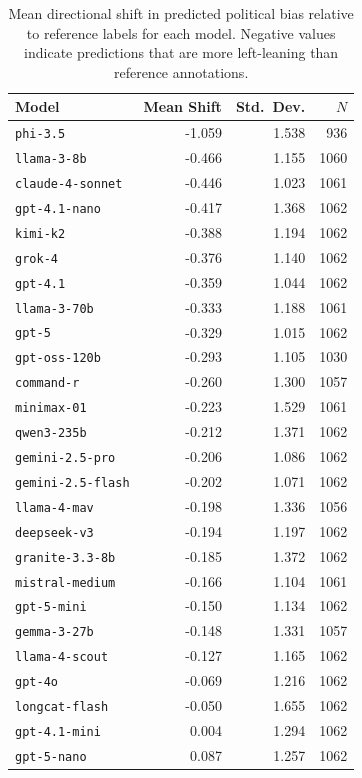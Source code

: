 \documentclass[11pt]{article}
\begin{document}
\begin{table}[t]
\centering
\small
\setlength{\tabcolsep}{3.5pt}
\begin{tabular}{l r r r}
\toprule
\textbf{Model} & \textbf{Mean Shift} & \textbf{Std.\ Dev.} & \textbf{$N$} \\
\midrule
\texttt{phi-3.5}          & -1.059 & 1.538 & 936 \\
\texttt{llama-3-8b}       & -0.466 & 1.155 & 1060 \\
\texttt{claude-4-sonnet}  & -0.446 & 1.023 & 1061 \\
\texttt{gpt-4.1-nano}     & -0.417 & 1.368 & 1062 \\
\texttt{kimi-k2}          & -0.388 & 1.194 & 1062 \\
\texttt{grok-4}           & -0.376 & 1.140 & 1062 \\
\texttt{gpt-4.1}          & -0.359 & 1.044 & 1062 \\
\texttt{llama-3-70b}      & -0.333 & 1.188 & 1061 \\
\texttt{gpt-5}            & -0.329 & 1.015 & 1062 \\
\texttt{gpt-oss-120b}     & -0.293 & 1.105 & 1030 \\
\texttt{command-r}        & -0.260 & 1.300 & 1057 \\
\texttt{minimax-01}       & -0.223 & 1.529 & 1061 \\
\texttt{qwen3-235b}       & -0.212 & 1.371 & 1062 \\
\texttt{gemini-2.5-pro}   & -0.206 & 1.086 & 1062 \\
\texttt{gemini-2.5-flash} & -0.202 & 1.071 & 1062 \\
\texttt{llama-4-mav}      & -0.198 & 1.336 & 1056 \\
\texttt{deepseek-v3}      & -0.194 & 1.197 & 1062 \\
\texttt{granite-3.3-8b}   & -0.185 & 1.372 & 1062 \\
\texttt{mistral-medium}   & -0.166 & 1.104 & 1061 \\
\texttt{gpt-5-mini}       & -0.150 & 1.134 & 1062 \\
\texttt{gemma-3-27b}      & -0.148 & 1.331 & 1057 \\
\texttt{llama-4-scout}    & -0.127 & 1.165 & 1062 \\
\texttt{gpt-4o}           & -0.069 & 1.216 & 1062 \\
\texttt{longcat-flash}    & -0.050 & 1.655 & 1062 \\
\texttt{gpt-4.1-mini}     &  0.004 & 1.294 & 1062 \\
\texttt{gpt-5-nano}       &  0.087 & 1.257 & 1062 \\
\bottomrule
\end{tabular}
\caption{Mean directional shift in predicted political bias relative to reference labels for each model. Negative values indicate predictions that are more left-leaning than reference annotations.}
\label{tab:center_shift}
\end{table}
\end{document}
